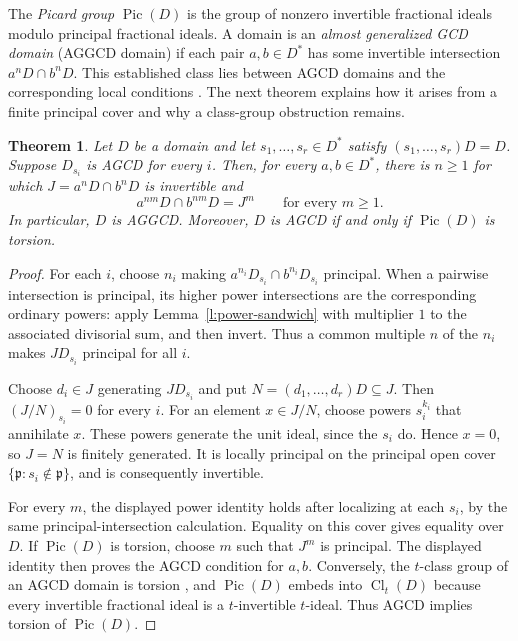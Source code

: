 \documentclass[11pt]{amsart}
\newtheorem{theorem}{Theorem}[section]
\theoremstyle{definition}
\theoremstyle{remark}
\DeclareMathOperator{\Cl}{Cl}
\DeclareMathOperator{\Pic}{Pic}
\begin{document}
The \emph{Picard group} $\Pic(D)$ is the group of nonzero
invertible fractional ideals modulo principal fractional ideals.
A domain is an \emph{almost generalized GCD domain} (AGGCD domain)
if each pair $a,b\in D^\ast$ has some invertible intersection
$a^nD\cap b^nD$. This established class lies between AGCD domains
and the corresponding local conditions \cite{ACZlocal, Lewin}.
The next theorem explains how it arises from a finite principal
cover and why a class-group obstruction remains.

\begin{theorem}\label{t:principal-cover-picard}
Let $D$ be a domain and let $s_1,\ldots,s_r\in D^\ast$ satisfy
$(s_1,\ldots,s_r)D=D$. Suppose $D_{s_i}$ is AGCD for every $i$.
Then, for every $a,b\in D^\ast$, there is $n\geq1$ for which
$J=a^nD\cap b^nD$ is invertible and
\[
 a^{nm}D\cap b^{nm}D=J^m
 \qquad\text{for every }m\geq1.
\]
In particular, $D$ is AGGCD. Moreover, $D$ is AGCD if and only
if $\Pic(D)$ is torsion.
\end{theorem}

\begin{proof}
For each $i$, choose $n_i$ making
$a^{n_i}D_{s_i}\cap b^{n_i}D_{s_i}$ principal.
When a pairwise intersection is principal, its higher power
intersections are the corresponding ordinary powers: apply
Lemma~\ref{l:power-sandwich} with multiplier $1$ to the
associated divisorial sum, and then invert.
Thus a common multiple $n$ of the $n_i$ makes
$JD_{s_i}$ principal for all $i$.

Choose $d_i\in J$ generating $JD_{s_i}$ and put
$N=(d_1,\ldots,d_r)D\subseteq J$.
Then $(J/N)_{s_i}=0$ for every $i$.
For an element $x\in J/N$, choose powers $s_i^{k_i}$ that
annihilate $x$. These powers generate the unit ideal, since
the $s_i$ do. Hence $x=0$, so $J=N$ is finitely generated.
It is locally principal on the principal open cover
$\{\mathfrak p:s_i\notin\mathfrak p\}$, and is consequently
invertible.

For every $m$, the displayed power identity holds after
localizing at each $s_i$, by the same principal-intersection
calculation. Equality on this cover gives equality over $D$.
If $\Pic(D)$ is torsion, choose $m$ such that $J^m$ is
principal. The displayed identity then proves the AGCD
condition for $a,b$. Conversely, the $t$-class group of an
AGCD domain is torsion \cite[Theorem~3.4]{AZ-Bez}, and
$\Pic(D)$ embeds into $\Cl_t(D)$ because every invertible
fractional ideal is a $t$-invertible $t$-ideal. Thus AGCD
implies torsion of $\Pic(D)$.
\end{proof}
\end{document}
